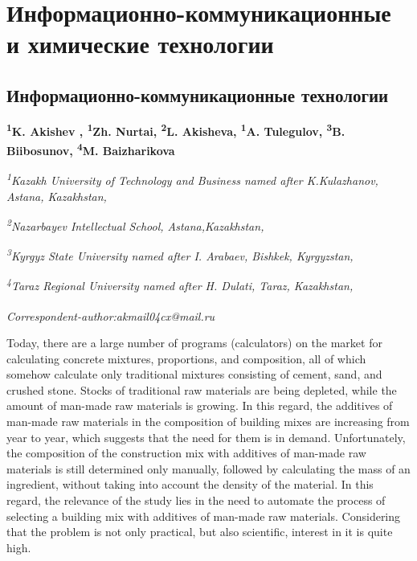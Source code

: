 \newpage
\let\cleardoublepage\clearpage
\part{Информационно-коммуникационные и химические технологии}
\chapter{Информационно-коммуникационные технологии}

\begin{articleheader}

{\bfseries
\textsuperscript{1}K. Akishev\textsuperscript{\envelope } \authorid,
\textsuperscript{1}Zh. Nurtai\authorid,
\textsuperscript{2}L. Akisheva\authorid,
\textsuperscript{1}A. Tulegulov\authorid,
\textsuperscript{3}B. Biibosunov\authorid,
\textsuperscript{4}M. Baizharikova\authorid}
\end{articleheader}

\begin{affiliation}
\emph{\textsuperscript{1}Kazakh University of Technology and Business named after K.Kulazhanov, Astana, Kazakhstan,}

\emph{\textsuperscript{2}Nazarbayev Intellectual School, Astana,Kazakhstan,}

\emph{\textsuperscript{3}Kyrgyz State University named after I. Arabaev, Bishkek, Kyrgyzstan,}

\emph{\textsuperscript{4}Taraz Regional University named after H. Dulati, Taraz, Kazakhstan,}

\raggedright \textsuperscript{\envelope }{\em Correspondent-author:akmail04cx@mail.ru}
\end{affiliation}

Today, there are a large number of programs (calculators) on the market
for calculating concrete mixtures, proportions, and composition, all of
which somehow calculate only traditional mixtures consisting of cement,
sand, and crushed stone. Stocks of traditional raw materials are being
depleted, while the amount of man-made raw materials is growing. In this
regard, the additives of man-made raw materials in the composition of
building mixes are increasing from year to year, which suggests that the
need for them is in demand. Unfortunately, the composition of the
construction mix with additives of man-made raw materials is still
determined only manually, followed by calculating the mass of an
ingredient, without taking into account the density of the material. In
this regard, the relevance of the study lies in the need to automate the
process of selecting a building mix with additives of man-made raw
materials. Considering that the problem is not only practical, but also
scientific, interest in it is quite high.

